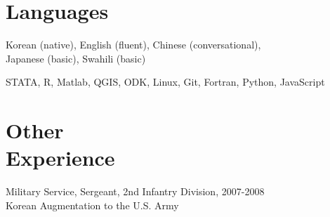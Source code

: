 \documentclass[letterpaper, margin, 10pt]{res} %
\newcommand{\blank}[1]{\hspace*{#1}\linebreak[0]}
\begin{document}
\begin{resume}

\section{\sc \textbf{Languages}}
Korean (native), English (fluent), Chinese (conversational), \\ Japanese (basic), Swahili (basic)

STATA, R, Matlab, QGIS, ODK, Linux, Git, Fortran, Python, JavaScript

\section{\sc \textbf{Other \\ Experience}}
Military Service, Sergeant, 2nd Infantry Division, \hfill{2007-2008} \\
\blank{0.5cm} Korean Augmentation to the U.S. Army





\end{resume}
\end{document}
